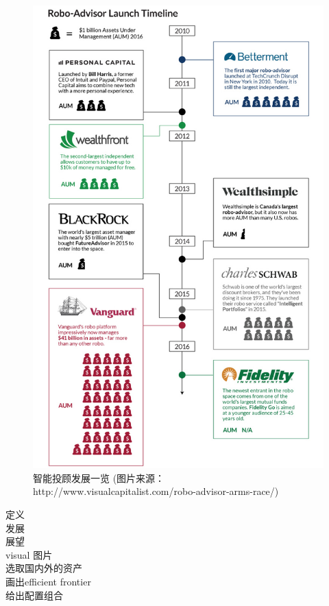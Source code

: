 \documentclass[a4paper, 11pt, UTF8]{report}
\begin{document}
\begin{figure}[htbp!]
        \centering
        \includegraphics[height=0.9\textheight]{advisor}
        \caption{智能投顾发展一览 \newline (图片来源：http://www.visualcapitalist.com/robo-advisor-arms-race/)}
        \label{fig:adviosr}
\end{figure}



定义\\
发展\\
展望\\
visual 图片\\
选取国内外的资产\\
画出efficient frontier\\
给出配置组合\\
\end{document}
